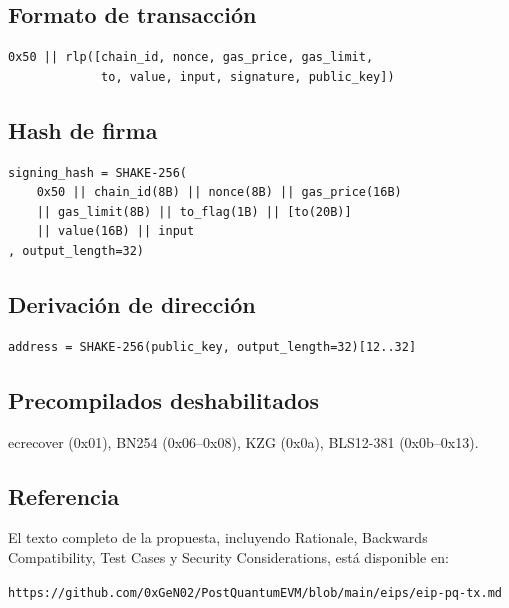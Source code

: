 \subsection*{Formato de transacción}

\begin{verbatim}
0x50 || rlp([chain_id, nonce, gas_price, gas_limit,
             to, value, input, signature, public_key])
\end{verbatim}

\subsection*{Hash de firma}

\begin{verbatim}
signing_hash = SHAKE-256(
    0x50 || chain_id(8B) || nonce(8B) || gas_price(16B)
    || gas_limit(8B) || to_flag(1B) || [to(20B)]
    || value(16B) || input
, output_length=32)
\end{verbatim}

\subsection*{Derivación de dirección}

\begin{verbatim}
address = SHAKE-256(public_key, output_length=32)[12..32]
\end{verbatim}

\subsection*{Precompilados deshabilitados}

ecrecover (0x01), BN254 (0x06--0x08), KZG (0x0a), BLS12-381 (0x0b--0x13).

\subsection*{Referencia}

El texto completo de la propuesta, incluyendo Rationale, Backwards Compatibility, Test Cases y Security Considerations, está disponible en:

\begin{center}
\texttt{https://github.com/0xGeN02/PostQuantumEVM/blob/main/eips/eip-pq-tx.md}
\end{center}
